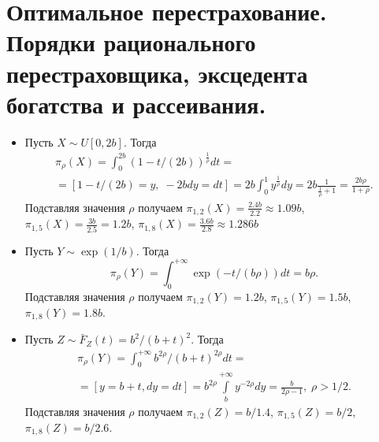 \chapter{Оптимальное перестрахование. Порядки рационального перестраховщика, эксцедента богатства и рассеивания.}
\problem{}

\solution{}
\begin{itemize}
    \item Пусть $X \sim U[0,2b]$. Тогда
    \begin{multline}
        \pi_\rho(X) = \int_0^{2b} (1 - t/(2b) ) ^{\frac{1}{\rho}} dt =\\= [ 1 - t/(2b) = y, \; -2bdy = dt] = 2b\int_0^1 y^{\frac1\rho} dy = 2b \frac{1}{\frac{1}{\rho} + 1} = \frac{2b\rho}{1 + \rho}.
    \end{multline}
    Подставляя значения $\rho$ получаем $\pi_{1,2}(X) = \frac{2.4 b}{2.2} \approx 1.09b$, $\pi_{1,5}(X) = \frac{3 b}{2.5} = 1.2b$, $\pi_{1,8}(X) = \frac{3.6 b}{2.8} \approx 1.286b$
    \item Пусть $Y \sim \exp(1/b)$. Тогда 
    \begin{equation}
        \pi_\rho(Y) = \int_0^{+\infty} \exp(-t/(b\rho)) dt = b\rho .
    \end{equation}
     Подставляя значения $\rho$ получаем  $\pi_{1,2}(Y) = 1.2b$, $\pi_{1,5}(Y) = 1.5b$,  $\pi_{1,8}(Y) = 1.8b$.

     \item Пусть $Z \sim \bar F_Z(t) = b^2 /(b+t)^2$. Тогда 
     \begin{multline}
         \pi_\rho(Y) = \int_0^{+\infty} b^{2\rho}/(b+ t)^{2\rho} dt =\\= [ y = b + t, dy = dt] = b^{2\rho}\int\limits_{b}^{+\infty} y^{-2\rho}dy = \frac{b}{2\rho - 1}, \; \rho>1/2.
     \end{multline}
     Подставляя  значения $\rho$ получаем $\pi_{1,2}(Z) = b/1.4$, $\pi_{1,5}(Z) = b/2$, $\pi_{1,8}(Z) = b/2.6$.
\end{itemize}